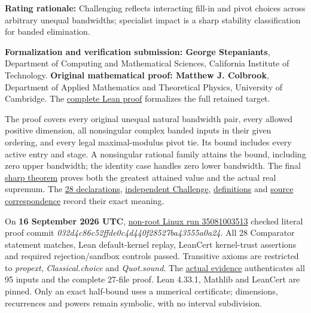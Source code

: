 \documentclass[11pt,a4paper]{article}
\makeatletter
\renewcommand{\subsection}{\Needspace{4\baselineskip}\@startsection{subsection}{2}{0pt}{9pt plus 1pt minus 1pt}{3pt}{\sffamily\bfseries\normalsize\color{ink}}}
\makeatother
\begin{document}
\textbf{Rating rationale:} Challenging reflects interacting fill-in and
pivot choices across arbitrary unequal bandwidths; specialist impact is
a sharp stability classification for banded elimination.

\subsection{Lean proof and verification
evidence}\label{lean-proof-and-verification-evidence}

\textbf{Formalization and verification submission: George Stepaniants},
Department of Computing and Mathematical Sciences, California Institute
of Technology. \textbf{Original mathematical proof: Matthew J.
Colbrook}, Department of Applied Mathematics and Theoretical Physics,
University of Cambridge. The
\href{https://github.com/sgstepaniants/OpenProblemsInNLA/blob/032d4c86c52ffde0c4d440f28527ba43555a0a24/linear-systems-and-elimination/IE-13/lean/Solution.lean}{complete
Lean proof} formalizes the full retained target.

The proof covers every original unequal natural bandwidth pair, every
allowed positive dimension, all nonsingular complex banded inputs in
their given ordering, and every legal maximal-modulus pivot tie. Its
bound includes every active entry and stage. A nonsingular rational
family attains the bound, including zero upper bandwidth; the identity
case handles zero lower bandwidth. The final
\href{https://github.com/ajt60gaibb/OpenProblemsInNLA/blob/main/linear-systems-and-elimination/IE-13/lean/NLA/IE13/Sharp.lean}{sharp
theorem} proves both the greatest attained value and the actual real
supremum. The
\href{https://github.com/ajt60gaibb/OpenProblemsInNLA/blob/main/linear-systems-and-elimination/IE-13/lean/formalization.yaml}{28
declarations},
\href{https://github.com/ajt60gaibb/OpenProblemsInNLA/blob/main/linear-systems-and-elimination/IE-13/lean/Challenge.lean}{independent
Challenge},
\href{https://github.com/ajt60gaibb/OpenProblemsInNLA/blob/main/linear-systems-and-elimination/IE-13/lean/NLA/IE13/Definitions.lean}{definitions}
and
\href{https://github.com/ajt60gaibb/OpenProblemsInNLA/blob/main/linear-systems-and-elimination/IE-13/lean/SourceCorrespondence.md}{source
correspondence} record their exact meaning.

On \textbf{16 September 2026 UTC},
\href{https://github.com/sgstepaniants/OpenProblemsInNLA/actions/runs/35081003513/job/104744813757}{non-root
Linux run 35081003513} checked literal proof commit
\textit{032d4c86c52ffde0c4d440f28527ba43555a0a24}. All 28 Comparator
statement matches, Lean default-kernel replay, LeanCert kernel-trust
assertions and required rejection/sandbox controls passed. Transitive
axioms are restricted to \textit{propext}, \textit{Classical.choice} and
\textit{Quot.sound}. The
\href{https://github.com/ajt60gaibb/OpenProblemsInNLA/blob/main/linear-systems-and-elimination/IE-13/lean/verification/linux-2026-09-16/README.md}{actual
evidence} authenticates all 95 inputs and the complete 27-file proof.
Lean 4.33.1, Mathlib and LeanCert are pinned. Only an exact half-bound
uses a numerical certificate; dimensions, recurrences and powers remain
symbolic, with no interval subdivision.
\end{document}
